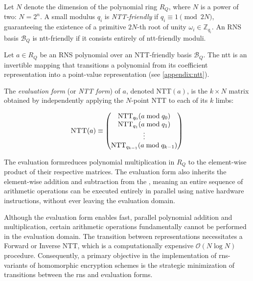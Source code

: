 \begin{definition}
    \label{def:ntt-friendly}
    Let $N$ denote the dimension of the polynomial ring $R_Q$, where $N$ is a power of two: $N=2^n$. A small modulus $q_i$ is \emph{NTT-friendly} if $q_i \equiv 1 \pmod{2N}$, guaranteeing the existence of a primitive $2N$-th root of unity $\omega_i \in \mathbb{Z}_{q_i}$. An RNS basis $\mathcal{B}_Q$ is \gls{ntt}-friendly if it consists entirely of \gls{ntt}-friendly moduli.
\end{definition}

\newcommand{\secondForm}{evaluation form}
\begin{definition}
    \label{def:ntt-form}
    Let $a \in R_Q$ be an RNS polynomial over an NTT-friendly basis $\mathcal{B}_Q$. The \gls{ntt} is an invertible mapping that transitions a polynomial from its coefficient representation into a point-value representation (see \autoref{appendix:ntt}).
    
    The \emph{\secondForm} (or \emph{NTT form}) of $a$, denoted $\text{NTT}(a)$, is the $k \times N$ matrix obtained by independently applying the $N$-point NTT to each of its $k$ limbs:
    
    \begin{equation}
        \label{form:ntt}
        \Call{NTT}{a}
        \equiv
        \begin{pmatrix}
            \text{NTT}_{q_0}(a \bmod{q_0}) \\
            \text{NTT}_{q_1}(a \bmod{q_1}) \\
            \vdots \\
            \text{NTT}_{q_{k-1}}(a \bmod{q_{k-1}})
        \end{pmatrix}
    \end{equation}
\end{definition}

The \secondForm reduces polynomial multiplication in $R_Q$ to the element-wise product of their respective matrices. The \secondForm{} also inherits the element-wise addition and subtraction from the \firstForm, meaning an entire sequence of arithmetic operations can be executed entirely in parallel using native hardware instructions, without ever leaving the evaluation domain.

Although the evaluation form enables fast, parallel polynomial addition and multiplication, certain arithmetic operations fundamentally cannot be performed in the evaluation domain. The transition between representations necessitates a Forward or Inverse NTT, which is a computationally expensive $\mathcal{O}(N \log N)$ procedure. Consequently, a primary objective in the implementation of \gls{rns}-variants of homomorphic encryption schemes is the strategic minimization of transitions between the \gls{rns} and evaluation forms.
